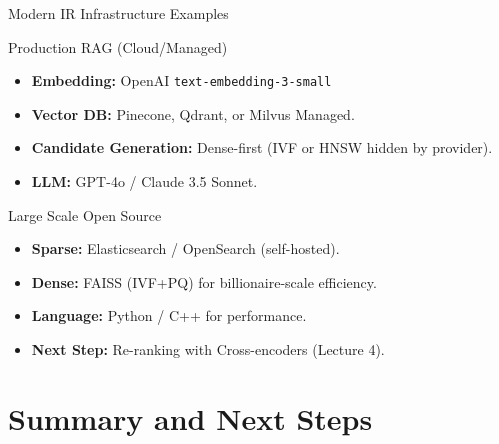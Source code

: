 \documentclass[aspectratio=169]{beamer}
\begin{document}
\begin{frame}[shrink=20]{Modern IR Infrastructure Examples}
\begin{block}{Production RAG (Cloud/Managed)}
\begin{itemize}
    \item \textbf{Embedding:} OpenAI \texttt{text-embedding-3-small}
    \item \textbf{Vector DB:} Pinecone, Qdrant, or Milvus Managed.
    \item \textbf{Candidate Generation:} Dense-first (IVF or HNSW hidden by provider).
    \item \textbf{LLM:} GPT-4o / Claude 3.5 Sonnet.
\end{itemize}
\end{block}

\begin{block}{Large Scale Open Source}
\begin{itemize}
    \item \textbf{Sparse:} Elasticsearch / OpenSearch (self-hosted).
    \item \textbf{Dense:} FAISS (IVF+PQ) for billionaire-scale efficiency.
    \item \textbf{Language:} Python / C++ for performance.
    \item \textbf{Next Step:} Re-ranking with Cross-encoders (Lecture 4).
\end{itemize}
\end{block}
\end{frame}



\section{Summary and Next Steps}
\end{document}
